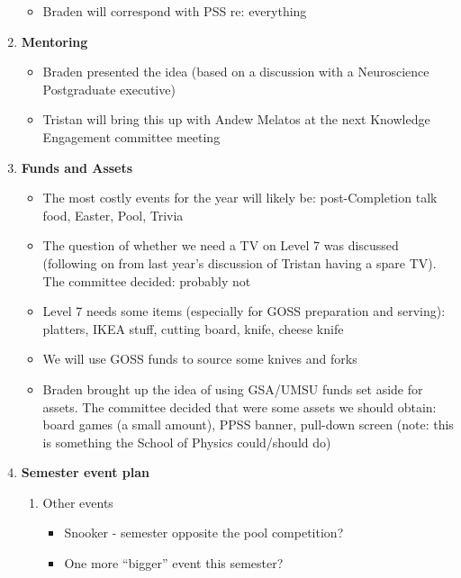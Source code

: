 \documentclass[a4paper,12pt]{article}
\newcommand{\itemi}[1]{\bf\large #1}
\begin{document}
\begin{enumerate}
\begin{itemize}
\item Braden will correspond with PSS re: everything

\end{itemize}

\item {\itemi Mentoring}
\begin{itemize}
\item Braden presented the idea (based on a discussion with a Neuroscience Postgraduate executive)

\item Tristan will bring this up with Andew Melatos at the next Knowledge Engagement committee meeting
\end{itemize}

\item {\itemi Funds and Assets}
\begin{itemize}
\item The most costly events for the year will likely be: post-Completion talk food, Easter, Pool, Trivia

\item The question of whether we need a TV on Level 7 was discussed (following on from last year's discussion of Tristan having a spare TV). The committee decided: probably not

\item Level 7 needs some items (especially for GOSS preparation and serving): platters, IKEA stuff, cutting board, knife, cheese knife

\item We will use GOSS funds to source some knives and forks

\item Braden brought up the idea of using GSA/UMSU funds set aside for assets. The committee decided that were some assets we should obtain: board games (a small amount), PPSS banner, pull-down screen (note: this is something the School of Physics could/should do)
\end{itemize}

\item {\itemi Semester event plan}
	\begin{enumerate}
	\item Other events
	\begin{itemize}
	\item Snooker - semester opposite the pool competition?
	
	\item One more ``bigger'' event this semester?
	

\end{itemize}
\end{enumerate}
\end{enumerate}
\end{document}
